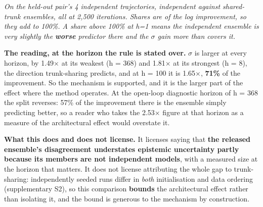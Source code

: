 \documentclass[10pt]{article}
\begin{document}
\begin{center}\small{}\end{center}

\emph{On the held-out pair's 4 independent trajectories, independent against shared-trunk ensembles, all at 2,500 iterations. Shares are of the log improvement, so they add to 100\%. A share above 100\% at h=1 means the independent ensemble is very slightly the \textbf{worse} predictor there and the $\sigma$ gain more than covers it.}

\textbf{The reading, at the horizon the rule is stated over.} $\sigma$ is larger at every horizon, by 1.49$\times$ at its weakest (h = 368) and 1.81$\times$ at its strongest (h = 8), the direction trunk-sharing predicts, and at h = 100 it is 1.65$\times$, \textbf{71\%} of the improvement. So the mechanism is supported, and it is the larger part of the effect where the method operates. At the open-loop diagnostic horizon of h = 368 the split reverses: 57\% of the improvement there is the ensemble simply predicting better, so a reader who takes the 2.53$\times$ figure at that horizon as a measure of the architectural effect would overstate it.

\textbf{What this does and does not license.} It licenses saying that \textbf{the released ensemble's disagreement understates epistemic uncertainty partly because its members are not independent models}, with a measured size at the horizon that matters. It does not license attributing the whole gap to trunk-sharing: independently seeded runs differ in \emph{both} initialisation and data ordering (supplementary S2), so this comparison \textbf{bounds} the architectural effect rather than isolating it, and the bound is generous to the mechanism by construction.
\end{document}
